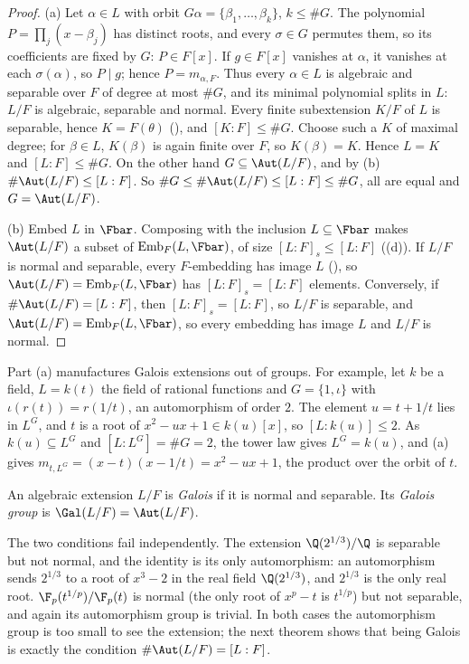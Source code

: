 \begin{proof}
(a) Let $\alpha\in L$ with orbit $G\alpha=\{\beta_1,\dots,\beta_k\}$, $k\le\#G$. The polynomial $P=\prod_j(x-\beta_j)$ has distinct roots, and every
$\sigma\in G$ permutes them, so its coefficients are fixed by $G$: $P\in F[x]$. If $g\in F[x]$ vanishes at $\alpha$, it vanishes at each $\sigma(\alpha)$, so $P\mid g$;
hence $P=m_{\alpha,F}$. Thus every $\alpha\in L$ is algebraic and separable over $F$ of degree at most $\#G$, and its minimal polynomial splits in $L$: $L/F$ is
algebraic, separable and normal. Every finite subextension $K/F$ of $L$ is separable, hence $K=F(\theta)$ (), and
$[K:F]\le\#G$. Choose such a $K$ of maximal degree; for $\beta\in L$, $K(\beta)$ is again finite over $F$, so $K(\beta)=K$. Hence $L=K$ and $[L:F]\le\#G$. On the
other hand $G\subseteq\Aut(L/F)$, and by (b) $\#\Aut(L/F)\le[L:F]$. So $\#G\le\#\Aut(L/F)\le[L:F]\le\#G$, all are equal and $G=\Aut(L/F)$.

(b) Embed $L$ in $\Fbar$. Composing with the inclusion $L\subseteq\Fbar$ makes $\Aut(L/F)$ a subset of $\mathrm{Emb}_F(L,\Fbar)$, of size $[L:F]_s\le[L:F]$
((d)). If $L/F$ is normal and separable, every $F$-embedding has image $L$ (), so $\Aut(L/F)=
\mathrm{Emb}_F(L,\Fbar)$ has $[L:F]_s=[L:F]$ elements. Conversely, if $\#\Aut(L/F)=[L:F]$, then $[L:F]_s=[L:F]$, so $L/F$ is separable, and
$\Aut(L/F)=\mathrm{Emb}_F(L,\Fbar)$, so every embedding has image $L$ and $L/F$ is normal.
\end{proof}

Part (a) manufactures Galois extensions out of groups. For example, let $k$ be a field, $L=k(t)$ the field of rational functions and $G=\{1,\iota\}$ with
$\iota(r(t))=r(1/t)$, an automorphism of order $2$. The element $u=t+1/t$ lies in $L^G$, and $t$ is a root of $x^2-ux+1\in k(u)[x]$, so $[L:k(u)]\le2$. As
$k(u)\subseteq L^G$ and $[L:L^G]=\#G=2$, the tower law gives $L^G=k(u)$, and (a) gives $m_{t,L^G}=(x-t)(x-1/t)=x^2-ux+1$, the product over the orbit of $t$.

\begin{definition}\label{def:galois:galois}
An algebraic extension $L/F$ is \emph{Galois} if it is normal and separable. Its \emph{Galois group} is $\Gal(L/F)=\Aut(L/F)$.
\end{definition}

The two conditions fail independently. The extension $\Q(2^{1/3})/\Q$ is separable but not normal, and the identity is its only automorphism: an
automorphism sends $2^{1/3}$ to a root of $x^3-2$ in the real field $\Q(2^{1/3})$, and $2^{1/3}$ is the only real root. $\F_p(t^{1/p})/\F_p(t)$ is normal (the only root of $x^p-t$ is $t^{1/p}$) but not
separable, and again its automorphism group is trivial. In both cases the automorphism group is too small to see the extension; the next theorem shows that being
Galois is exactly the condition $\#\Aut(L/F)=[L:F]$.

